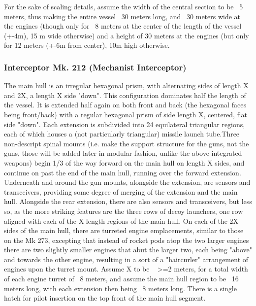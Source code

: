 For the sake of scaling details, assume the width of the central section to be ~5 meters, thus making the entire vessel ~30 meters long, and ~30 meters wide at the engines (though only for ~8 meters at the center of the length of the vessel (+-4m), 15 m wide otherwise) and a height of 30 meters at the engines (but only for 12 meters (+-6m from center), 10m high otherwise. 

\subsubsection{Interceptor Mk. 212 (Mechanist Interceptor)}

The main hull is an irregular hexagonal prism, with alternating sides of length X and 2X, a length X side "down". This configuration dominates half the length of the vessel. It is extended half again on both front and back (the hexagonal faces being front/back) with a regular hexagonal prism of side length X, centered, flat side "down". Each extension is subdivided into 24 equilateral triangular regions, each of which houses a (not particularly triangular) missile launch tube.Three non-descript spinal mounts (i.e. make the support structure for the guns, not the guns, those will be added later in modular fashion, unlike the above integrated weapons) begin 1/3 of the way forward on the main hull on length X sides, and continue on past the end of the main hull, running over the forward extension. Underneath and around the gun mounts, alongside the extension, are sensors and transceivers, providing some degree of merging of the extension and the main hull. Alongside the rear extension, there are also sensors and transceivers, but less so, as the more striking features are the three rows of decoy launchers, one row aligned with each of the X length regions of the main hull. On each of the 2X sides of the main hull, there are turreted engine emplacements, similar to those on the Mk 273, excepting that instead of rocket pods atop the two larger engines there are two slightly smaller engines that abut the larger two, each being "above" and towards the other engine, resulting in a sort of a "haircurler" arrangement of engines upon the turret mount. Assume X to be ~ >=2 meters, for a total width of each engine turret of ~8 meters, and assume the main hull region to be ~16 meters long, with each extension then being ~8 meters long. There is a single hatch for pilot insertion on the top front of the main hull segment.

